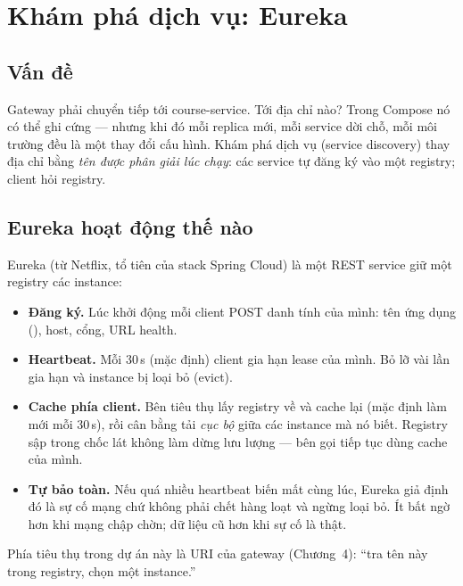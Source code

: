 \chapter{Khám phá dịch vụ: Eureka}
\label{ch:eureka}

\section{Vấn đề}

Gateway phải chuyển tiếp  tới course-service. Tới địa
chỉ nào? Trong Compose nó có thể ghi cứng  ---
nhưng khi đó mỗi replica mới, mỗi service dời chỗ, mỗi môi trường đều là
một thay đổi cấu hình. Khám phá dịch vụ (service discovery) thay địa chỉ
bằng \emph{tên được phân giải lúc chạy}: các service tự đăng ký vào một
registry; client hỏi registry.

\section{Eureka hoạt động thế nào}

Eureka (từ Netflix, tổ tiên của stack Spring Cloud) là một REST service
giữ một registry các instance:

\begin{itemize}
  \item \textbf{Đăng ký.} Lúc khởi động mỗi client POST danh tính của
  mình: tên ứng dụng (), host, cổng, URL
  health.
  \item \textbf{Heartbeat.} Mỗi 30\,s (mặc định) client gia hạn lease của
  mình. Bỏ lỡ vài lần gia hạn và instance bị loại bỏ (evict).
  \item \textbf{Cache phía client.} Bên tiêu thụ lấy registry về và cache
  lại (mặc định làm mới mỗi 30\,s), rồi cân bằng tải \emph{cục bộ} giữa
  các instance mà nó biết. Registry sập trong chốc lát không làm dừng
  lưu lượng --- bên gọi tiếp tục dùng cache của mình.
  \item \textbf{Tự bảo toàn.} Nếu quá nhiều heartbeat biến mất cùng lúc,
  Eureka giả định đó là sự cố mạng chứ không phải chết hàng loạt và ngừng
  loại bỏ. Ít bất ngờ hơn khi mạng chập chờn; dữ liệu cũ hơn khi sự cố
  là thật.
\end{itemize}

Phía tiêu thụ trong dự án này là URI  của
gateway (Chương~4): ``tra tên này trong registry, chọn một instance.''

